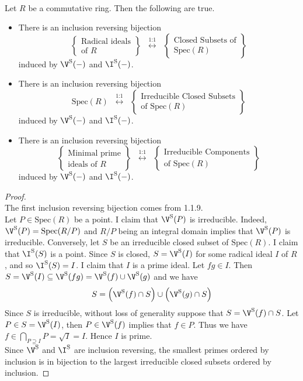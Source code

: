 \documentclass[a4paper]{article}
\begin{document}
\begin{prp}{}{}\\
Let $R$ be a commutative ring. Then the following are true. 
\begin{itemize}
\item There is an inclusion reversing bijection $$\left\{\substack{\text{Radical ideals}\\\text{of }R}\right\}\;\;\overset{\text{1:1}}{\longleftrightarrow}\;\;\left\{\substack{\text{Closed Subsets of}\\\text{Spec}(R)}\right\}$$ induced by $\V^\text{S}(-)$ and $\I^\text{S}(-)$. 
\item There is an inclusion reversing bijection $$\text{Spec}(R)\;\;\overset{\text{1:1}}{\longleftrightarrow}\;\;\left\{\substack{\text{Irreducible Closed Subsets}\\ \text{of Spec}(R)}\right\}$$ induced by $\V^\text{S}(-)$ and $\I^\text{S}(-)$. 
\item There is an inclusion reversing bijection $$\left\{\substack{\text{Minimal prime}\\\text{ideals of }R}\right\}\;\;\overset{\text{1:1}}{\longleftrightarrow}\;\;\left\{\substack{\text{Irreducible Components}\\ \text{of Spec}(R)}\right\}$$ induced by $\V^\text{S}(-)$ and $\I^\text{S}(-)$. 
\end{itemize}
\begin{proof}\\
The first inclusion reversing bijection comes from 1.1.9. \\

Let $P\in\text{Spec}(R)$ be a point. I claim that $\V^\text{S}(P)$ is irreducible. Indeed, $\V^\text{S}(P)=\text{Spec}(R/P)$ and $R/P$ being an integral domain implies that $\V^\text{S}(P)$ is irreducible. Conversely, let $S$ be an irreducible closed subset of $\text{Spec}(R)$. I claim that $\I^\text{S}(S)$ is a point. Since $S$ is closed, $S=\V^\text{S}(I)$ for some radical ideal $I$ of $R$, and so $\I^\text{S}(S)=I$. I claim that $I$ is a prime ideal. Let $fg\in I$. Then $S=\V^\text{S}(I)\subseteq\V^\text{S}(fg)=\V^\text{S}(f)\cup\V^\text{S}(g)$ and we have $$S=\left(\V^\text{S}(f)\cap S\right)\cup\left(\V^\text{S}(g)\cap S\right)$$ Since $S$ is irreducible, without loss of generality suppose that $S=\V^\text{S}(f)\cap S$. Let $P\in S=\V^\text{S}(I)$, then $P\in\V^\text{S}(f)$ implies that $f\in P$. Thus we have $f\in\bigcap_{P\supseteq I}P=\sqrt{I}=I$. Hence $I$ is prime. \\

Since $\V^\text{S}$ and $\I^\text{S}$ are inclusion reversing, the smallest primes ordered by inclusion is in bijection to the largest irreducible closed subsets ordered by inclusion. 
\end{proof}
\end{prp}
\end{document}
